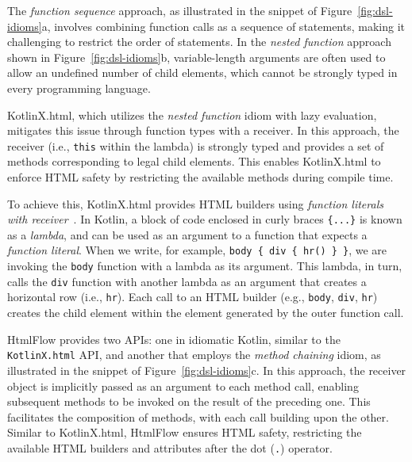 \documentclass[software,article,accept,pdftex,moreauthors]{Definitions/mdpi}
\begin{document}
The \textit{function sequence} approach, as illustrated in the snippet of
Figure~\ref{fig:dsl-idioms}a, involves combining function calls as a sequence
of statements, making it challenging to restrict the order of statements. In
the \textit{nested function} approach shown in Figure~\ref{fig:dsl-idioms}b,
variable-length arguments are often used to allow an undefined number of child
elements, which cannot be strongly typed in every programming language.

KotlinX.html, which utilizes the \textit{nested function} idiom with lazy
evaluation, mitigates this issue through function types with a receiver. In
this approach, the receiver (i.e., \texttt{this} within the lambda) is strongly
typed and provides a set of methods corresponding to legal child elements. This
enables KotlinX.html to enforce HTML safety by restricting the available
methods during compile time.

To achieve this, KotlinX.html provides HTML builders using \textit{function
  literals with receiver}~\cite{kotlinlang}. In Kotlin, a block of code enclosed
in curly braces \texttt{\{...\}} is known as a \emph{lambda}, and can be used
as an argument to a function that expects a \emph{function literal}. When we
write, for example, \texttt{body \{ div \{ hr() \} \}}, we are invoking the
\texttt{body} function with a lambda as its argument. This lambda, in turn,
calls the \texttt{div} function with another lambda as an argument that creates
a horizontal row (i.e., \texttt{hr}). Each call to an HTML builder (e.g.,
\texttt{body}, \texttt{div}, \texttt{hr}) creates the child element within the
element generated by the outer function call.

HtmlFlow provides two APIs: one in idiomatic Kotlin, similar to the
\texttt{KotlinX.html} API, and another that employs the \textit{method
  chaining} idiom, as illustrated in the snippet of
Figure~\ref{fig:dsl-idioms}c. In this approach, the receiver object is
implicitly passed as an argument to each method call, enabling subsequent
methods to be invoked on the result of the preceding one. This facilitates the
composition of methods, with each call building upon the other. Similar to
KotlinX.html, HtmlFlow ensures HTML safety, restricting the available HTML
builders and attributes after the dot (\texttt{.}) operator.

\end{document}
